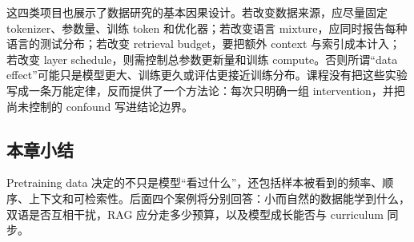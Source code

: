 这四类项目也展示了数据研究的基本因果设计。若改变数据来源，应尽量固定 tokenizer、参数量、训练 token 和优化器；若改变语言 mixture，应同时报告每种语言的测试分布；若改变 retrieval budget，要把额外 context 与索引成本计入；若改变 layer schedule，则需控制总参数更新量和训练 compute。否则所谓“data effect”可能只是模型更大、训练更久或评估更接近训练分布。课程没有把这些实验写成一条万能定律，反而提供了一个方法论：每次只明确一组 intervention，并把尚未控制的 confound 写进结论边界。

\subsection{本章小结}

Pretraining data 决定的不只是模型“看过什么”，还包括样本被看到的频率、顺序、上下文和可检索性。后面四个案例将分别回答：小而自然的数据能学到什么，双语是否互相干扰，RAG 应分走多少预算，以及模型成长能否与 curriculum 同步。

